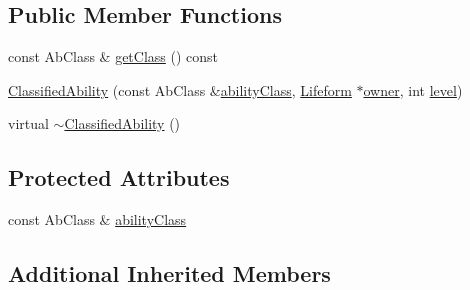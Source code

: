 \subsection*{Public Member Functions}
\begin{DoxyCompactItemize}
\item 
const Ab\+Class \& \hyperlink{classZeta_1_1ClassifiedAbility_ad50f45d360b911d4a67da6963b0d64ad}{get\+Class} () const 
\item 
\hyperlink{classZeta_1_1ClassifiedAbility_a4797947885ec916219ad1f2bf77c6689}{Classified\+Ability} (const Ab\+Class \&\hyperlink{classZeta_1_1ClassifiedAbility_abd6f78106602f84787cac967c2308abe}{ability\+Class}, \hyperlink{classZeta_1_1Lifeform}{Lifeform} $\ast$\hyperlink{classZeta_1_1Ability_ad37bed67f04178297d6fe4c9a2ed619a}{owner}, int \hyperlink{classZeta_1_1Ability_a41d29a6fb79dd19a7eed5f6a4be5de9a}{level})
\item 
virtual \hyperlink{classZeta_1_1ClassifiedAbility_a7746283195cf3a062c083d18d2a689d7}{$\sim$\+Classified\+Ability} ()
\end{DoxyCompactItemize}
\subsection*{Protected Attributes}
\begin{DoxyCompactItemize}
\item 
const Ab\+Class \& \hyperlink{classZeta_1_1ClassifiedAbility_abd6f78106602f84787cac967c2308abe}{ability\+Class}
\end{DoxyCompactItemize}
\subsection*{Additional Inherited Members}



